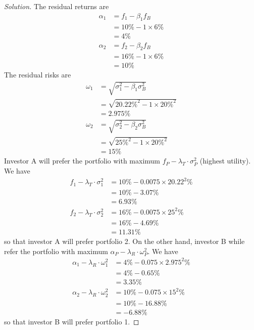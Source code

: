 \begin{proof}[Solution]
 The residual returns are
 \begin{align*}
  \alpha_{1} &= f_{1} - \beta_{1}f_{B} \\
	     &= 10\%-1\times 6\%\\
	     &= 4\% \\
  \alpha_{2} &= f_{2} - \beta_{2}f_{B} \\
	     &= 16\%-1\times 6\%\\
	     &= 10\% 
 \end{align*}
 The residual risks are
 \begin{align*}
  \omega_{1} &= \sqrt{\sigma_{1}^{2} - \beta_{1}\sigma_{B}^{2}} \\
	     &= \sqrt{20.22 \% ^{2} - 1\times 20 \% ^2} \\
	     &= 2.975 \%\\
  \omega_{2} &= \sqrt{\sigma_{2}^{2} - \beta_{2}\sigma_{B}^{2}} \\
	     &= \sqrt{25 \% ^{2} - 1\times 20 \% ^2} \\
	     &= 15 \%
 \end{align*}
 Investor A will prefer the portfolio with maximum $f_{P}-\lambda_{T}\cdot\sigma_{P}^{2}$ (highest utility). We have
 \begin{align*}
  f_{1}-\lambda_{T}\cdot\sigma_{1}^{2} &= 10\% - 0.0075 \times 20.22^{2} \% \\
				       &= 10\% - 3.07\% \\
				       &= 6.93\%\\
  f_{2}-\lambda_{T}\cdot\sigma_{2}^{2} &= 16\% - 0.0075 \times 25^{2} \% \\
				       &= 16\% - 4.69\% \\
				       &= 11.31\%       
 \end{align*}
 so that investor A will prefer portfolio 2. On the other hand, investor B while refer the portfolio with maximum $\alpha_{P}-\lambda_{R}\cdot\omega_{P}^{2}$. We have
 \begin{align*}
  \alpha_{1}-\lambda_{R}\cdot\omega_{1}^{2} &= 4\% - 0.075 \times 2.975^{2} \% \\
				       &= 4\% - 0.65\% \\
				       &= 3.35\%\\
  \alpha_{2}-\lambda_{R}\cdot\omega_{2}^{2} &= 10\% - 0.075 \times 15^{2} \% \\
				       &= 10\% - 16.88\% \\
				       &= -6.88\%
 \end{align*}
 so that investor B will prefer portfolio 1.

\end{proof}

